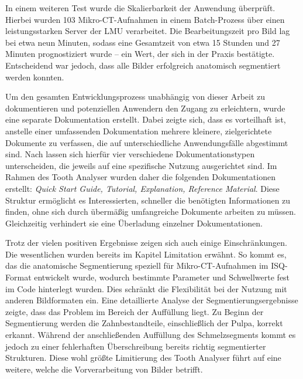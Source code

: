 In einem weiteren Test wurde die Skalierbarkeit der Anwendung überprüft. Hierbei
wurden 103 Mikro-\ac{CT}-Aufnahmen in einem Batch-Prozess über einen
leistungsstarken Server der LMU verarbeitet. Die Bearbeitungszeit pro Bild lag bei
etwa neun Minuten, sodass eine Gesamtzeit von etwa 15 Stunden und 27 Minuten
prognostiziert wurde – ein Wert, der sich in der Praxis bestätigte. Entscheidend
war jedoch, dass alle Bilder erfolgreich anatomisch segmentiert werden konnten.

Um den gesamten Entwicklungsprozess unabhängig von dieser Arbeit zu dokumentieren
und potenziellen Anwendern den Zugang zu erleichtern, wurde eine separate
Dokumentation erstellt. Dabei zeigte sich, dass es vorteilhaft ist, anstelle einer
umfassenden Dokumentation mehrere kleinere, zielgerichtete Dokumente zu
verfassen, die auf unterschiedliche Anwendungsfälle abgestimmt sind. Nach \citet{procida2017}
lassen sich hierfür vier verschiedene Dokumentationstypen unterscheiden, die
jeweils auf eine spezifische Nutzung ausgerichtet sind. Im Rahmen des Tooth Analyser
wurden daher die folgenden Dokumentationen erstellt: \textit{Quick Start Guide, Tutorial,
Explanation, Reference Material}. Diese Struktur ermöglicht es Interessierten, schneller
die benötigten Informationen zu finden, ohne sich durch übermäßig umfangreiche
Dokumente arbeiten zu müssen. Gleichzeitig verhindert sie eine Überladung einzelner
Dokumentationen.

Trotz der vielen positiven Ergebnisse zeigen sich auch einige Einschränkungen.
Die wesentlichen wurden bereits im Kapitel Limitation erwähnt. So kommt es, das
die anatomische Segmentierung speziell für Mikro-\ac{CT}-Aufnahmen im \ac{ISQ}-Format
entwickelt wurde, wodurch bestimmte Parameter und Schwellwerte fest im Code hinterlegt
wurden. Dies schränkt die Flexibilität bei der Nutzung mit anderen Bildformaten
ein. Eine detaillierte Analyse der Segmentierungsergebnisse zeigte, dass das
Problem im Bereich der Auffüllung liegt. Zu Beginn der Segmentierung werden die Zahnbestandteile,
einschließlich der Pulpa, korrekt erkannt. Während der anschließenden Auffüllung
des Schmelzsegments kommt es jedoch zu einer fehlerhaften Überschreibung bereits
richtig segmentierter Strukturen. Diese wohl größte Limitierung des Tooth Analyser
führt auf eine weitere, welche die Vorverarbeitung von Bilder betrifft.

